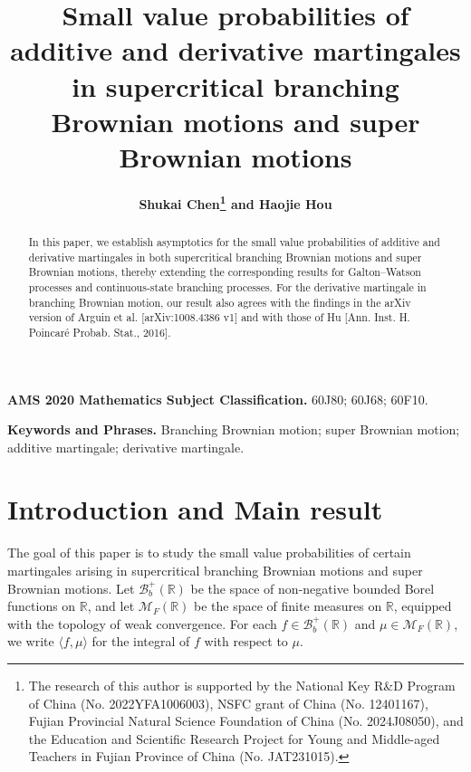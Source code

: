 \documentclass[11pt]{article}
\numberwithin{equation}{section}
\begin{document}
	\allowdisplaybreaks
	
	
	\title{\Large \bf Small value probabilities of additive and derivative martingales in supercritical branching  Brownian motions and super Brownian motions}
\author{ \bf 
	Shukai Chen\footnote{The research of this author is supported by the National Key R\&D Program of
		China (No. 2022YFA1006003), NSFC grant of China (No. 12401167), Fujian
		Provincial Natural Science Foundation of China (No. 2024J08050), and the
		Education and Scientific Research Project for Young and Middle-aged Teachers in
		Fujian Province of China (No. JAT231015).
	}
	\hspace{1mm}\hspace{1mm} and \hspace{1mm}\hspace{1mm}
	Haojie Hou
	}
	\date{}
	\maketitle
	
	\begin{abstract}
		 In this paper, we establish asymptotics for the small value probabilities of additive and derivative martingales in both supercritical branching Brownian motions and super Brownian motions, thereby extending the corresponding results for Galton--Watson processes and continuous-state branching processes. For the derivative martingale in branching Brownian motion, our result also agrees with the findings in the arXiv version of Arguin et al. [arXiv:1008.4386 v1] and with those of Hu [Ann. Inst. H. Poincar\'e Probab. Stat., 2016].
	\end{abstract}
	
	\medskip
	
	\noindent\textbf{AMS 2020 Mathematics Subject Classification.}
	60J80; 60J68; 60F10.
	
	
	\medskip
	
	\noindent\textbf{Keywords and Phrases.}
	Branching Brownian motion; super Brownian motion; additive martingale; derivative martingale.

\section{Introduction and Main result}


The goal of this paper is to study the small value probabilities of certain martingales arising in supercritical branching Brownian motions and super Brownian motions. Let $\mathcal{B}_b^+(\mathbb{R})$ be the space of  non-negative bounded Borel functions on $\mathbb{R}$, and let $\mathcal{M}_F(\mathbb{R})$ be the space of finite measures on $\mathbb{R}$, equipped with the topology of weak convergence. For each $f \in \mathcal{B}_b^+(\mathbb{R})$ and $\mu \in \mathcal{M}_F(\mathbb{R})$, we write $\langle f, \mu\rangle$ for the integral of $f$ with respect to $\mu$.
\end{document}
